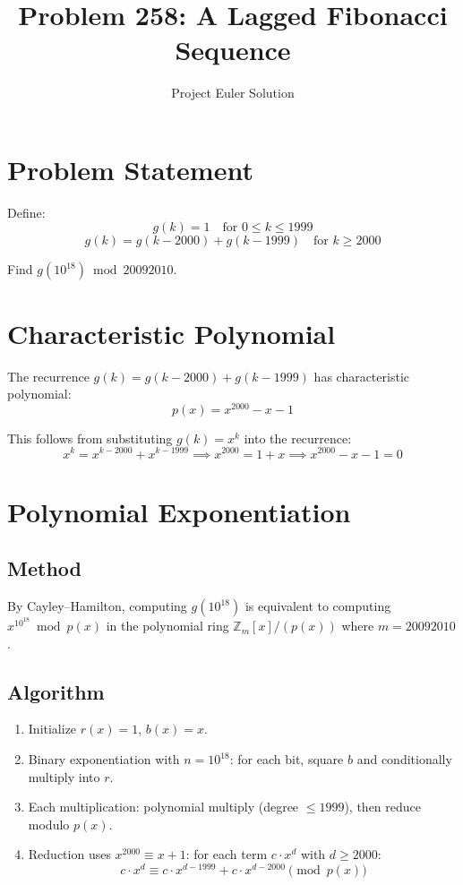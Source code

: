 \documentclass[12pt]{article}
\title{Problem 258: A Lagged Fibonacci Sequence}
\author{Project Euler Solution}
\date{}
\begin{document}
\maketitle

\section{Problem Statement}

Define:
\[
g(k) = 1 \quad \text{for } 0 \le k \le 1999
\]
\[
g(k) = g(k-2000) + g(k-1999) \quad \text{for } k \ge 2000
\]

Find $g(10^{18}) \bmod 20092010$.

\section{Characteristic Polynomial}

The recurrence $g(k) = g(k-2000) + g(k-1999)$ has characteristic polynomial:
\[
p(x) = x^{2000} - x - 1
\]

This follows from substituting $g(k) = x^k$ into the recurrence:
\[
x^k = x^{k-2000} + x^{k-1999} \implies x^{2000} = 1 + x \implies x^{2000} - x - 1 = 0
\]

\section{Polynomial Exponentiation}

\subsection{Method}

By Cayley--Hamilton, computing $g(10^{18})$ is equivalent to computing $x^{10^{18}} \bmod p(x)$ in the polynomial ring $\mathbb{Z}_m[x]/(p(x))$ where $m = 20092010$.

\subsection{Algorithm}

\begin{enumerate}
    \item Initialize $r(x) = 1$, $b(x) = x$.
    \item Binary exponentiation with $n = 10^{18}$: for each bit, square $b$ and conditionally multiply into $r$.
    \item Each multiplication: polynomial multiply (degree $\le 1999$), then reduce modulo $p(x)$.
    \item Reduction uses $x^{2000} \equiv x + 1$: for each term $c \cdot x^d$ with $d \ge 2000$:
    \[
    c \cdot x^d \equiv c \cdot x^{d-1999} + c \cdot x^{d-2000} \pmod{p(x)}
    \]
\end{enumerate}
\end{document}
